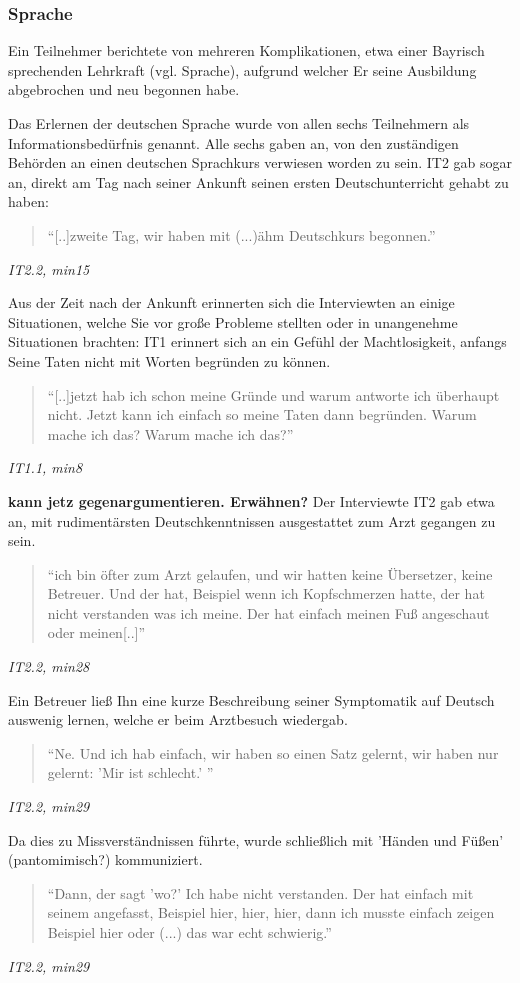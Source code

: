 \subsubsection{Sprache}

Ein Teilnehmer berichtete von mehreren Komplikationen, etwa einer Bayrisch sprechenden Lehrkraft (vgl. Sprache), aufgrund welcher Er seine Ausbildung abgebrochen und neu begonnen habe.


Das Erlernen der deutschen Sprache wurde von allen sechs Teilnehmern als Informationsbedürfnis genannt. Alle sechs gaben an, von den zuständigen Behörden an einen deutschen Sprachkurs verwiesen worden zu sein. IT2 gab sogar an, direkt am Tag nach seiner Ankunft seinen ersten Deutschunterricht gehabt zu haben:
\begin{quote}
    ``[..]zweite Tag, wir haben mit (...)ähm Deutschkurs begonnen.''
\end{quote}
\centerline{\textit{IT2.2, min15}}
Aus der Zeit nach der Ankunft erinnerten sich die Interviewten an einige Situationen, welche Sie vor große Probleme stellten oder in unangenehme Situationen brachten:\newline
IT1 erinnert sich an ein Gefühl der Machtlosigkeit, anfangs Seine Taten nicht mit Worten begründen zu können.
\begin{quote}
    ``[..]jetzt hab ich schon meine Gründe und warum antworte ich überhaupt nicht. Jetzt kann ich einfach so meine Taten dann begründen. Warum mache ich das? Warum mache ich das?''
\end{quote}
\centerline{\textit{IT1.1, min8}}
\textbf{kann jetz gegenargumentieren. Erwähnen?}
Der Interviewte IT2 gab etwa an, mit rudimentärsten Deutschkenntnissen ausgestattet zum Arzt gegangen zu sein. 
\begin{quote}
    ``ich bin öfter zum Arzt gelaufen, und wir hatten keine Übersetzer, keine Betreuer. Und der hat, Beispiel wenn ich Kopfschmerzen hatte, der hat nicht verstanden was ich meine. Der hat einfach meinen Fuß angeschaut oder meinen[..]''
\end{quote}
\centerline{\textit{IT2.2, min28}}
Ein Betreuer ließ Ihn eine kurze Beschreibung seiner Symptomatik auf Deutsch auswenig lernen, welche er beim Arztbesuch wiedergab. 
\begin{quote}
    ``Ne. Und ich hab einfach, wir haben so einen Satz gelernt, wir haben nur gelernt: 'Mir ist schlecht.' ''
\end{quote}
\centerline{\textit{IT2.2, min29}}
Da dies zu Missverständnissen führte, wurde schließlich mit 'Händen und Füßen' (pantomimisch?) kommuniziert.\newline
\begin{quote}
    ``Dann, der sagt 'wo?' Ich habe nicht verstanden. Der hat einfach mit seinem angefasst, Beispiel hier, hier, hier, dann ich musste einfach zeigen Beispiel hier oder (...) das war echt schwierig.''
\end{quote}
\centerline{\textit{IT2.2, min29}}

